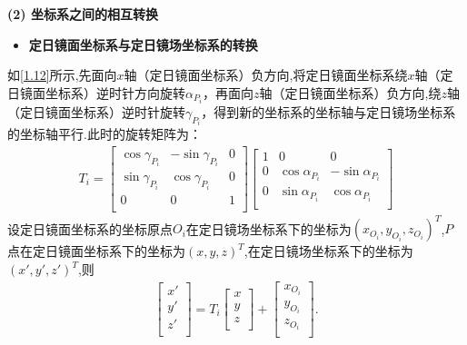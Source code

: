 \documentclass[../main.tex]{subfiles}
\begin{document}
\par \textbf{(2) 坐标系之间的相互转换}
\begin{itemize}
\item \textbf{定日镜面坐标系与定日镜场坐标系的转换}
\end{itemize}
\par 如\cref{1.12}所示,先面向$x$轴（定日镜面坐标系）负方向,将定日镜面坐标系绕$x$轴（定日镜面坐标系）逆时针方向旋转$\alpha _{P_i}$，再面向$z$轴（定日镜面坐标系）负方向,绕\(z\)轴（定日镜面坐标系）逆时针旋转$\gamma_{P_i}$，得到新的坐标系的坐标轴与定日镜场坐标系的坐标轴平行.此时的旋转矩阵为：
\begin{align}\label{1.15}
T_i=\left[ \begin{matrix}
\cos \gamma _{P_i}&		-\sin \gamma _{P_i}&		0\\
\sin \gamma _{P_i}&		\cos \gamma _{P_i}&		0\\
0&		0&		1\\
\end{matrix} \right] \left[ \begin{matrix}
1&		0&		0\\
0&		\cos \alpha _{P_i}&		-\sin \alpha _{P_i}\\
0&		\sin \alpha _{P_i}&		\cos \alpha _{P_i}\\
\end{matrix} \right] 
\end{align}
设定日镜面坐标系的坐标原点$O_i$在定日镜场坐标系下的坐标为$(x_{O_i},y_{O_i},z_{O_i})^T$,$P$点在定日镜面坐标系下的坐标为$(x,y,z)^T$,在定日镜场坐标系下的坐标为$(x',y',z')^T$,则
\begin{align}\label{eq:100.1}
\left[ \begin{matrix}
x'\\
y'\\
z'\\
\end{matrix} \right] =T_i\left[ \begin{matrix}
x\\
y\\
z\\
\end{matrix} \right]+\left[ \begin{matrix}
x_{O_i}\\
y_{O_i}\\
z_{O_i}\\
\end{matrix} \right].
\end{align}
\end{document}
